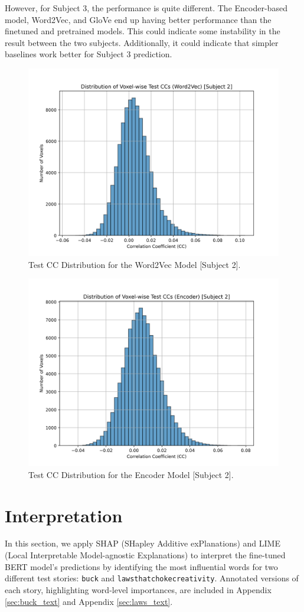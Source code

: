 \documentclass[10pt,letterpaper]{article}
\begin{document}
However, for Subject 3, the performance is quite different. The Encoder-based model, Word2Vec, and GloVe end up having better performance than the finetuned and pretrained models. This could indicate some instability in the result between the two subjects. Additionally, it could indicate that simpler baselines work better for Subject 3 prediction.

\begin{figure}[ht]
    \centering
    \includegraphics[width=0.5\linewidth]{figs/cc_dist_Word2Vec.png}
    \caption{Test CC Distribution for the Word2Vec Model [Subject 2].}
    \label{fig:cc_dist_Word2Vec}
\end{figure}

\begin{figure}[ht]
    \centering
    \includegraphics[width=0.5\linewidth]{figs/cc_dist_Encoder.png}
    \caption{Test CC Distribution for the Encoder Model [Subject 2].}
    \label{fig:cc_dist_Encoder}
\end{figure}


\section{Interpretation}

In this section, we apply SHAP (SHapley Additive exPlanations) and LIME (Local Interpretable Model-agnostic Explanations) to interpret the fine-tuned BERT model's predictions by identifying the most influential words for two different test stories: \texttt{buck} and \texttt{lawsthatchokecreativity}. Annotated versions of each story, highlighting word-level importances, are included in Appendix \ref{sec:buck_text} and Appendix \ref{sec:laws_text}.
\end{document}
